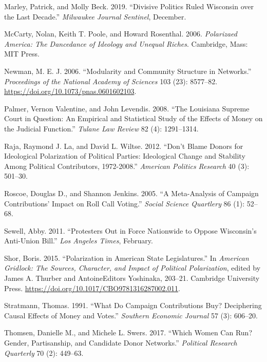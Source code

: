 \documentclass[12pt,]{article}
\begin{document}
\leavevmode\hypertarget{ref-marley2019}{}%
Marley, Patrick, and Molly Beck. 2019. ``Divisive Politics Ruled
Wisconsin over the Last Decade.'' \emph{Milwaukee Journal Sentinel},
December.

\leavevmode\hypertarget{ref-mccarty2006}{}%
McCarty, Nolan, Keith T. Poole, and Howard Rosenthal. 2006.
\emph{Polarizaed America: The Dancedance of Ideology and Unequal
Riches}. Cambridge, Mass: MIT Press.

\leavevmode\hypertarget{ref-newman2006}{}%
Newman, M. E. J. 2006. ``Modularity and Community Structure in
Networks.'' \emph{Proceedings of the National Academy of Sciences} 103
(23): 8577--82. \url{https://doi.org/10.1073/pnas.0601602103}.

\leavevmode\hypertarget{ref-palmer2008}{}%
Palmer, Vernon Valentine, and John Levendis. 2008. ``The Louisiana
Supreme Court in Question: An Empirical and Statistical Study of the
Effects of Money on the Judicial Function.'' \emph{Tulane Law Review} 82
(4): 1291--1314.

\leavevmode\hypertarget{ref-laraja2011}{}%
Raja, Raymond J. La, and David L. Wiltse. 2012. ``Don't Blame Donors for
Ideological Polarization of Political Parties: Ideological Change and
Stability Among Political Contributors, 1972-2008.'' \emph{American
Politics Research} 40 (3): 501--30.

\leavevmode\hypertarget{ref-roscoe2005}{}%
Roscoe, Douglas D., and Shannon Jenkins. 2005. ``A Meta-Analysis of
Campaign Contributions' Impact on Roll Call Voting.'' \emph{Social
Science Quartlery} 86 (1): 52--68.

\leavevmode\hypertarget{ref-sewell2011}{}%
Sewell, Abby. 2011. ``Protesters Out in Force Nationwide to Oppose
Wisconsin's Anti-Union Bill.'' \emph{Los Angeles Times}, February.

\leavevmode\hypertarget{ref-shor2015}{}%
Shor, Boris. 2015. ``Polarization in American State Legislatures.'' In
\emph{American Gridlock: The Sources, Character, and Impact of Political
Polarization}, edited by James A. Thurber and AntoineEditors Yoshinaka,
203--21. Cambridge University Press.
\url{https://doi.org/10.1017/CBO9781316287002.011}.

\leavevmode\hypertarget{ref-stratmann1991}{}%
Stratmann, Thomas. 1991. ``What Do Campaign Contributions Buy?
Deciphering Causal Effects of Money and Votes.'' \emph{Southern Economic
Journal} 57 (3): 606--20.

\leavevmode\hypertarget{ref-thomsen2017}{}%
Thomsen, Danielle M., and Michele L. Swers. 2017. ``Which Women Can Run?
Gender, Partisanship, and Candidate Donor Networks.'' \emph{Political
Research Quarterly} 70 (2): 449--63.
\end{document}
